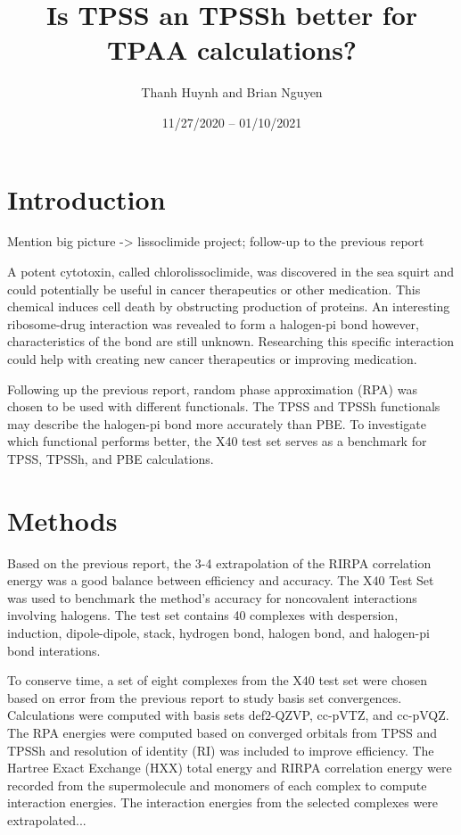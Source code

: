 \documentclass[11pt]{article}
\title{\textbf{Is TPSS an TPSSh better for TPAA calculations?}}
\author{Thanh Huynh and Brian Nguyen}
\date{11/27/2020 -- 01/10/2021 }
\newcommand{\brian}[1]{{\color{orange} #1}}
\begin{document}
\maketitle

\section{Introduction}

\brian{Mention big picture -> lissoclimide project; follow-up to the
  previous report}

A potent cytotoxin, called chlorolissoclimide, was discovered
in the sea squirt and could potentially be useful in cancer therapeutics
or other medication. This chemical induces cell death by obstructing
production of proteins. An interesting ribosome-drug interaction was
revealed to form a halogen-pi bond however, characteristics of the bond
are still unknown. Researching this specific interaction could help with
creating new cancer therapeutics or improving medication.

Following up the previous report, random phase approximation (RPA) was
chosen to be used with different functionals. The TPSS and TPSSh
functionals may describe the halogen-pi bond more accurately than PBE.
To investigate which functional performs better, the X40 test set serves
as a benchmark for TPSS, TPSSh, and PBE calculations.  


\section{Methods}

Based on the previous report, the 3-4 extrapolation of the RIRPA
correlation energy was a good balance between efficiency and accuracy.
The X40 Test Set was used to benchmark the method's accuracy for 
noncovalent interactions involving halogens. The test set contains 40
complexes with despersion, induction, dipole-dipole, stack, hydrogen
bond, halogen bond, and halogen-pi bond interations.

To conserve time, a set of eight complexes from the X40 test set were
chosen based on error from the previous report to study basis set
convergences. Calculations were computed with basis sets def2-QZVP,
cc-pVTZ, and cc-pVQZ. The RPA energies were computed based on converged
orbitals from TPSS and TPSSh and resolution of identity (RI) was included
to improve efficiency. The Hartree Exact Exchange (HXX) total energy and
RIRPA correlation energy were recorded from the supermolecule and monomers
of each complex to compute interaction energies. The interaction energies
from the selected complexes were extrapolated...
\end{document}
